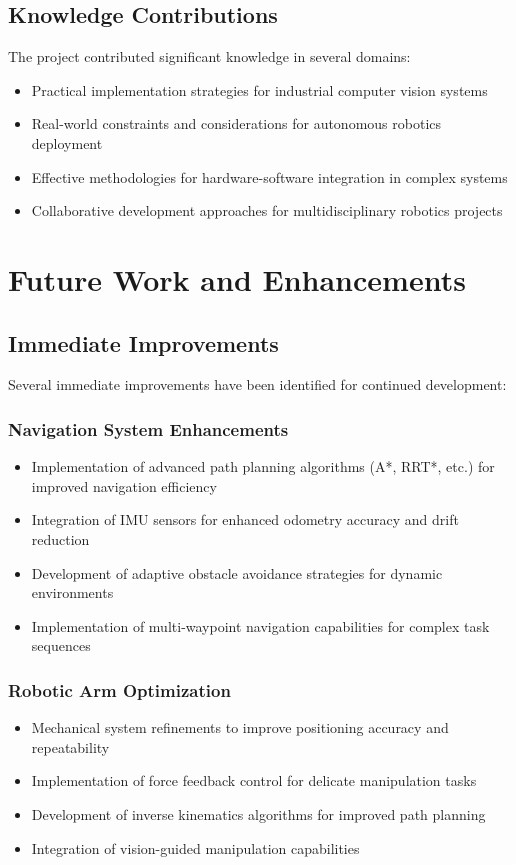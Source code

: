 \documentclass{book}
\begin{document}
\subsection{Knowledge Contributions}

\par\noindent The project contributed significant knowledge in several domains:

\begin{itemize}
\item Practical implementation strategies for industrial computer vision systems
\item Real-world constraints and considerations for autonomous robotics deployment
\item Effective methodologies for hardware-software integration in complex systems
\item Collaborative development approaches for multidisciplinary robotics projects
\end{itemize}

\section{Future Work and Enhancements}

\subsection{Immediate Improvements}

\par\noindent Several immediate improvements have been identified for continued development:

\subsubsection{Navigation System Enhancements}
\begin{itemize}
\item Implementation of advanced path planning algorithms (A*, RRT*, etc.) for improved navigation efficiency
\item Integration of IMU sensors for enhanced odometry accuracy and drift reduction
\item Development of adaptive obstacle avoidance strategies for dynamic environments
\item Implementation of multi-waypoint navigation capabilities for complex task sequences
\end{itemize}

\subsubsection{Robotic Arm Optimization}
\begin{itemize}
\item Mechanical system refinements to improve positioning accuracy and repeatability
\item Implementation of force feedback control for delicate manipulation tasks
\item Development of inverse kinematics algorithms for improved path planning
\item Integration of vision-guided manipulation capabilities
\end{itemize}
\end{document}
